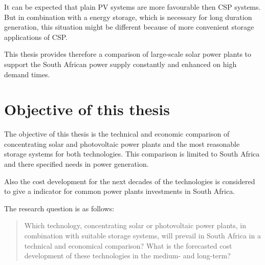 It can be expected that plain PV systems are more favourable then CSP systems. But in combination with a energy storage, which is necessary for long duration generation, this situation might be different because of more convenient storage applications of CSP.

This thesis provides therefore a comparison of large-scale solar power plants to support the South African power supply constantly and enhanced on high demand times.
\section{Objective of this thesis}
The objective of this thesis is the technical and economic comparison of concentrating solar and photovoltaic power plants and the most reasonable storage systems for both technologies. This comparison is limited to South Africa and there specified needs in power generation.

Also the cost development for the next decades of the technologies is considered to give a indicator for common power plants investments in South Africa.

The research question is as follows:
\begin{quote}
Which technology, concentrating solar or photovoltaic power plants, in combination with suitable storage systems, will prevail in South Africa in a technical and economical comparison? What is the forecasted cost development of these technologies in the medium- and long-term?
\end{quote}